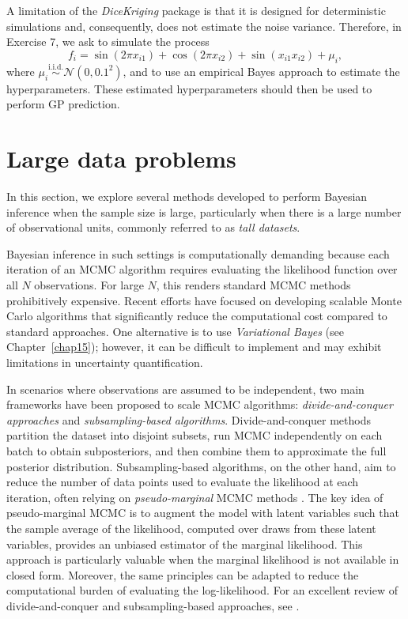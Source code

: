 A limitation of the \textit{DiceKriging} package is that it is designed for deterministic simulations and, consequently, does not estimate the noise variance. Therefore, in Exercise 7, we ask to simulate the process
\[
f_i = \sin(2\pi x_{i1}) + \cos(2\pi x_{i2}) + \sin(x_{i1} x_{i2}) + \mu_i,
\]
where \( \mu_i \overset{\text{i.i.d.}}{\sim} \mathcal{N}(0, 0.1^2) \), and to use an empirical Bayes approach to estimate the hyperparameters. These estimated hyperparameters should then be used to perform GP prediction.

\section{Large data problems}\label{13_5}
In this section, we explore several methods developed to perform Bayesian inference when the sample size is large, particularly when there is a large number of observational units, commonly referred to as \textit{tall datasets}.

Bayesian inference in such settings is computationally demanding because each iteration of an MCMC algorithm requires evaluating the likelihood function over all \( N \) observations. For large \( N \), this renders standard MCMC methods prohibitively expensive. Recent efforts have focused on developing scalable Monte Carlo algorithms that significantly reduce the computational cost compared to standard approaches. One alternative is to use \textit{Variational Bayes} (see Chapter~\ref{chap15}); however, it can be difficult to implement and may exhibit limitations in uncertainty quantification.

In scenarios where observations are assumed to be independent, two main frameworks have been proposed to scale MCMC algorithms: \textit{divide-and-conquer approaches} and \textit{subsampling-based algorithms}. Divide-and-conquer methods partition the dataset into disjoint subsets, run MCMC independently on each batch to obtain subposteriors, and then combine them to approximate the full posterior distribution. Subsampling-based algorithms, on the other hand, aim to reduce the number of data points used to evaluate the likelihood at each iteration, often relying on \textit{pseudo-marginal} MCMC methods \cite{andrieu2009pseudoefficient}. The key idea of pseudo-marginal MCMC is to augment the model with latent variables such that the sample average of the likelihood, computed over draws from these latent variables, provides an unbiased estimator of the marginal likelihood. This approach is particularly valuable when the marginal likelihood is not available in closed form. Moreover, the same principles can be adapted to reduce the computational burden of evaluating the log-likelihood. For an excellent review of divide-and-conquer and subsampling-based approaches, see \cite{bardenet2017markov}.

